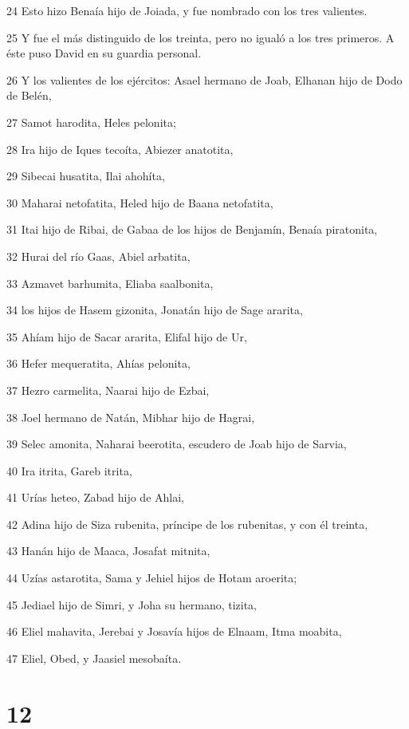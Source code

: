 \par 24 Esto hizo Benaía hijo de Joiada, y fue nombrado con los tres valientes.
\par 25 Y fue el más distinguido de los treinta, pero no igualó a los tres primeros. A éste puso David en su guardia personal.
\par 26 Y los valientes de los ejércitos: Asael hermano de Joab, Elhanan hijo de Dodo de Belén,
\par 27 Samot harodita, Heles pelonita;
\par 28 Ira hijo de Iques tecoíta, Abiezer anatotita,
\par 29 Sibecai husatita, Ilai ahohíta,
\par 30 Maharai netofatita, Heled hijo de Baana netofatita,
\par 31 Itai hijo de Ribai, de Gabaa de los hijos de Benjamín, Benaía piratonita,
\par 32 Hurai del río Gaas, Abiel arbatita,
\par 33 Azmavet barhumita, Eliaba saalbonita,
\par 34 los hijos de Hasem gizonita, Jonatán hijo de Sage ararita,
\par 35 Ahíam hijo de Sacar ararita, Elifal hijo de Ur,
\par 36 Hefer mequeratita, Ahías pelonita,
\par 37 Hezro carmelita, Naarai hijo de Ezbai,
\par 38 Joel hermano de Natán, Mibhar hijo de Hagrai,
\par 39 Selec amonita, Naharai beerotita, escudero de Joab hijo de Sarvia,
\par 40 Ira itrita, Gareb itrita,
\par 41 Urías heteo, Zabad hijo de Ahlai,
\par 42 Adina hijo de Siza rubenita, príncipe de los rubenitas, y con él treinta,
\par 43 Hanán hijo de Maaca, Josafat mitnita,
\par 44 Uzías astarotita, Sama y Jehiel hijos de Hotam aroerita;
\par 45 Jediael hijo de Simri, y Joha su hermano, tizita,
\par 46 Eliel mahavita, Jerebai y Josavía hijos de Elnaam, Itma moabita,
\par 47 Eliel, Obed, y Jaasiel mesobaíta.

\chapter{12}

